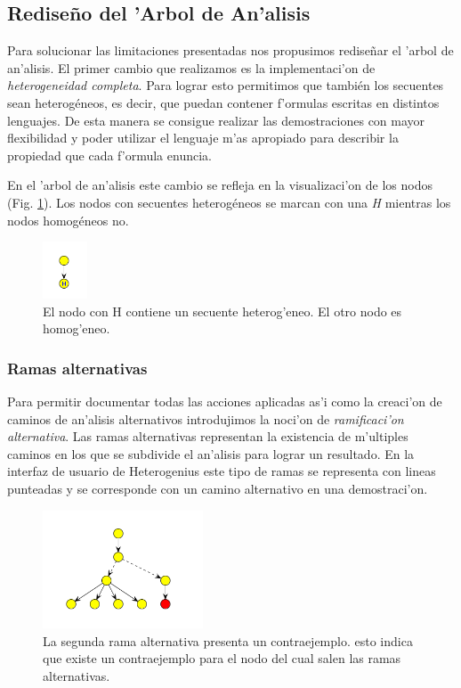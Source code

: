 \subsection{Rediseño del 'Arbol de An'alisis}

Para solucionar las limitaciones presentadas nos propusimos rediseñar el 'arbol de an'alisis.
El primer cambio que realizamos es la implementaci'on de \emph{heterogeneidad completa}.
Para lograr esto permitimos que también los secuentes sean heterogéneos, es decir, que puedan contener f'ormulas escritas en distintos lenguajes. De esta manera se consigue realizar las demostraciones con mayor flexibilidad y poder utilizar el lenguaje m'as apropiado para describir la propiedad que cada f'ormula enuncia.

En el 'arbol de an'alisis este cambio se refleja en la visualizaci'on de los nodos (Fig. \ref{hetero_homo}). Los nodos con secuentes heterogéneos se marcan con una \textit{H} mientras los nodos homogéneos no.

\begin{figure}[]
	\includegraphics[width=50px]{img/hetero_homo.png}
	\centering
	\caption{El nodo con H contiene un secuente heterog'eneo. El otro nodo es homog'eneo.}
	\label{hetero_homo}
\end{figure}


\subsubsection{Ramas alternativas}

Para permitir documentar todas las acciones aplicadas as'i como la creaci'on de caminos de an'alisis alternativos introdujimos la noci'on de \textit{ramificaci'on alternativa}.
Las ramas alternativas representan la existencia de m'ultiples caminos en los que se subdivide el an'alisis para lograr un resultado. En la interfaz de usuario de Heterogenius este tipo de ramas se representa con lineas punteadas y se corresponde con un camino alternativo en una demostraci'on.

\begin{figure}[]
	\includegraphics[width=180px]{img/ramas_alternativas_2.png}
	\centering
	\caption{La segunda rama alternativa presenta un contraejemplo. esto indica que existe un contraejemplo para el nodo del cual salen las ramas alternativas.}
        \label{alter1}
\end{figure}

